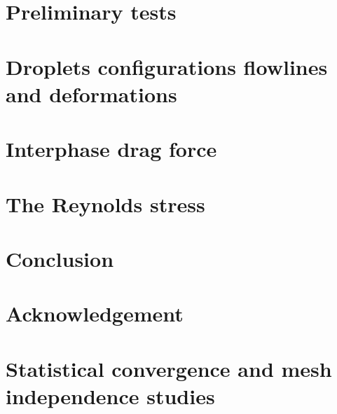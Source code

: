 \documentclass[12pt]{My_preprint}
\begin{document}
\section{Preliminary tests}
\label{sec:preliminary}

\section{Droplets configurations flowlines and deformations }



\section{Interphase drag force}



\section{The Reynolds stress}

% 
% 


\section{Conclusion}


\section*{Acknowledgement}

\appendix
\section{Statistical convergence and mesh independence studies}
\label{ap:A}


\end{document}
